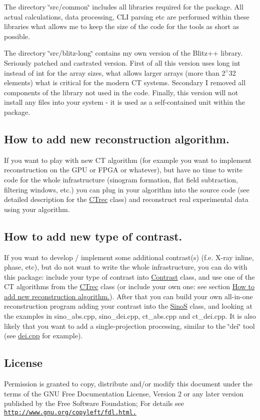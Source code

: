 The directory \char`\"{}src/common\char`\"{} includes all libraries required for the package. All actual calculations, data processing, CLI parsing etc are performed within these libraries what allows me to keep the size of the code for the tools as short as possible.

The directory \char`\"{}src/blitz-\/long\char`\"{} contains my own version of the Blitz++ library. Seriously patched and castrated version. First of all this version uses long int instead of int for the array sizes, what allows larger arrays (more than 2$^\wedge$32 elements) what is critical for the modern CT systems. Secondary I removed all components of the library not used in the code. Finally, this version will not install any files into your system -\/ it is used as a self-\/contained unit within the package.\hypertarget{index_algo}{}\subsection{How to add new reconstruction algorithm.}\label{index_algo}
If you want to play with new CT algorithm (for example you want to implement reconstruction on the GPU or FPGA or whatever), but have no time to write code for the whole infrastructure (sinogram formation, flat field subtraction, filtering windows, etc.) you can plug in your algorithm into the source code (see detailed description for the \hyperlink{classCTrec}{CTrec} class) and reconstruct real experimental data using your algorithm.\hypertarget{index_contrast}{}\subsection{How to add new type of contrast.}\label{index_contrast}
If you want to develop / implement some additional contrast(s) (f.e. X-\/ray inline, phase, etc), but do not want to write the whole infrastructure, you can do with this package: include your type of contrast into \hyperlink{classContrast}{Contrast} class, and use one of the CT algorithms from the \hyperlink{classCTrec}{CTrec} class (or include your own one: see section \hyperlink{index_algo}{How to add new reconstruction algorithm.}). After that you can build your own all-\/in-\/one reconstruction program adding your contrast into the \hyperlink{classSinoS}{SinoS} class, and looking at the examples in sino\_\-abs.cpp, sino\_\-dei.cpp, ct\_\-abs.cpp and ct\_\-dei.cpp. It is also likely that you want to add a single-\/projection processing, similar to the \char`\"{}dei\char`\"{} tool (see \hyperlink{dei_8cpp}{dei.cpp} for example).\hypertarget{index_lic}{}\subsection{License}\label{index_lic}
Permission is granted to copy, distribute and/or modify this document under the terms of the GNU Free Documentation License, Version 2 or any later version published by the Free Software Foundation; For details see \href{http://www.gnu.org/copyleft/fdl.html.}{\tt http://www.gnu.org/copyleft/fdl.html.} 